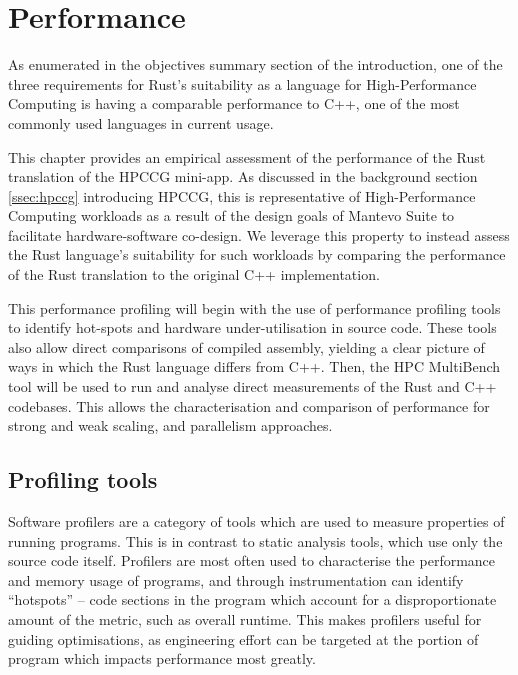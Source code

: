 \chapter{Performance}
\label{ch:performance}


As enumerated in the objectives summary section of the introduction, one of the three requirements for Rust's suitability as a language for High-Performance Computing is having a comparable performance to C++, one of the most commonly used languages in current usage.

This chapter provides an empirical assessment of the performance of the Rust translation of the HPCCG mini-app. As discussed in the background section \ref{ssec:hpccg} introducing HPCCG, this is representative of High-Performance Computing workloads as a result of the design goals of Mantevo Suite to facilitate hardware-software co-design. We leverage this property to instead assess the Rust language's suitability for such workloads by comparing the performance of the Rust translation to the original C++ implementation.

This performance profiling will begin with the use of performance profiling tools to identify hot-spots and hardware under-utilisation in source code. These tools also allow direct comparisons of compiled assembly, yielding a clear picture of ways in which the Rust language differs from C++. Then, the HPC MultiBench tool will be used to run and analyse direct measurements of the Rust and C++ codebases. This allows the characterisation and comparison of performance for strong and weak scaling, and parallelism approaches.

\section{Profiling tools}
\label{sec:profiling-tools}

Software profilers are a category of tools which are used to measure properties of running programs. This is in contrast to static analysis tools, which use only the source code itself. Profilers are most often used to characterise the performance and memory usage of programs, and through instrumentation can identify ``hotspots'' -- code sections in the program which account for a disproportionate amount of the metric, such as overall runtime. This makes profilers useful for guiding optimisations, as engineering effort can be targeted at the portion of program which impacts performance most greatly.

